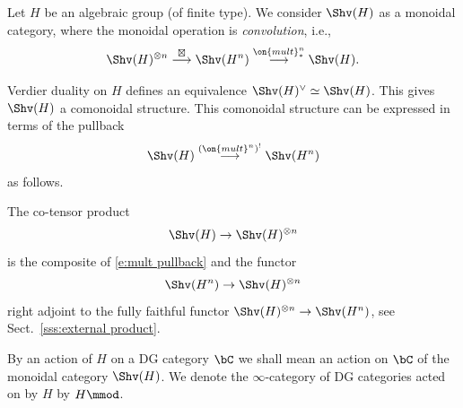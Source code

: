 \documentclass[9pt]{amsart}
\newtheorem{lem}[subsubsection]{Lemma}
\theoremstyle{definition}
\theoremstyle{remark}
\newcommand{\secref}[1]{Sect.~\ref{#1}}
\numberwithin{equation}{section}
\begin{document}

\sssec{}  \label{sss:definition of action}

Let $H$ be an algebraic group (of finite type). We consider $\Shv(H)$ as a monoidal category, where the monoidal 
operation is \emph{convolution}, i.e., 
$$\Shv(H)^{\otimes n}\overset{\boxtimes}\longrightarrow \Shv(H^n) \overset{\on{mult}^n_*}\longrightarrow \Shv(H).$$

\medskip

Verdier duality on $H$ defines an equivalence $\Shv(H)^\vee\simeq \Shv(H)$. This gives $\Shv(H)$ a comonoidal
structure. This comonoidal structure can be expressed in terms of the pullback
\begin{equation} \label{e:mult pullback}
\Shv(H) \overset{(\on{mult}^n)^!}\longrightarrow \Shv(H^n)
\end{equation}
as follows.

\medskip

The co-tensor product
$$\Shv(H) \to \Shv(H)^{\otimes n}$$
is the composite of \eqref{e:mult pullback} and the functor 
$$\Shv(H^n)\to \Shv(H)^{\otimes n}$$
right adjoint to the fully faithful functor
$\Shv(H)^{\otimes n}\to \Shv(H^n)$, see \secref{sss:external product}. 

\sssec{}  

By an action of $H$ on a DG category $\bC$ we shall mean an action on $\bC$ of the monoidal category
$\Shv(H)$. We denote the $\infty$-category of DG categories acted on by $H$ by $H\mmod$. 

%
%
%
%
%
%
%
%
%
\end{document}
